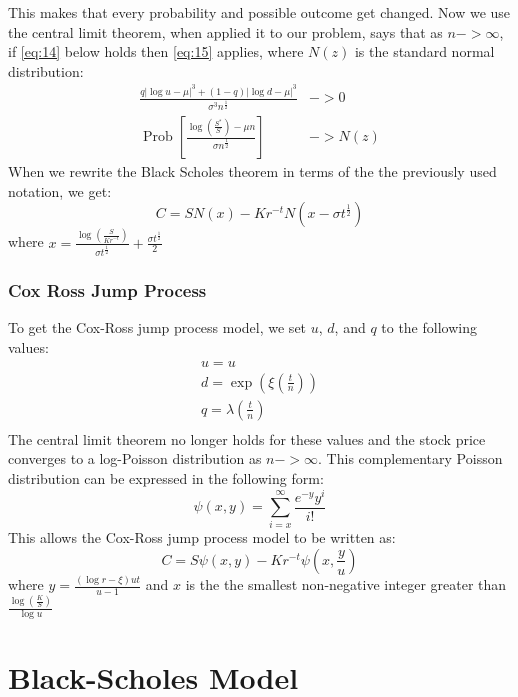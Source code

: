 \documentclass{article}
\DeclareMathOperator{\Prob}{Prob}
\begin{document}
This makes that every probability and possible outcome get changed. Now we use the central limit theorem, when applied it to our problem, says that as $n -> \infty$, if \ref{eq:14} below holds then \ref{eq:15} applies, where $N(z)$ is the standard normal distribution:
\begin{align} \label{eq:14}
    \frac{q|\log u - \mu|^{3} + (1-q)|\log d - \mu|^{3}}{\sigma^{3}n^{\frac{1}{2}}} & -> 0 \\
    \Prob\left[\frac{\log\left(\frac{S^{*}}{S}\right) - \mu n}{\sigma n^{\frac{1}{2}}}\right] & -> N(z) \label{eq:15}
\end{align}
When we rewrite the Black Scholes theorem in terms of the the previously used notation, we get:
\begin{equation}
   C =  S N(x) - K r^{-t} N(x - \sigma t^{\frac{1}{2}})
\end{equation}
where $x = \frac{\log\left(\frac{S}{Kr^{-t}}\right)}{\sigma t^{\frac{1}{2}}} + \frac{\sigma t^{\frac{1}{2}}}{2}$
\subsubsection{Cox Ross Jump Process}
To get the Cox-Ross jump process model, we set $u$, $d$, and $q$ to the following values:
\begin{gather*}
    u = u \\
    d = \exp\left(\xi\left(\frac{t}{n}\right)\right) \\
    q = \lambda \left(\frac{t}{n}\right) \\
\end{gather*}
The central limit theorem no longer holds for these values and the stock price converges to a log-Poisson distribution as $n -> \infty$. This complementary Poisson distribution can be expressed in the following form:
\begin{equation}
    \psi (x,y) = \sum_{i=x}^{\infty} \frac{e^{-y}y^{i}}{i!}
\end{equation}
This allows the Cox-Ross jump process model to be written as:
\begin{equation}
    C = S \psi(x,y) - Kr^{-t} \psi\left(x,\frac{y}{u}\right)
\end{equation}
where $y=\frac{(\log r - \xi) u t }{u-1}$ and $x$ is the the smallest non-negative integer greater than $\frac{\log\left(\frac{K}{S}\right)}{\log u}$
\section{Black-Scholes Model}
\end{document}
